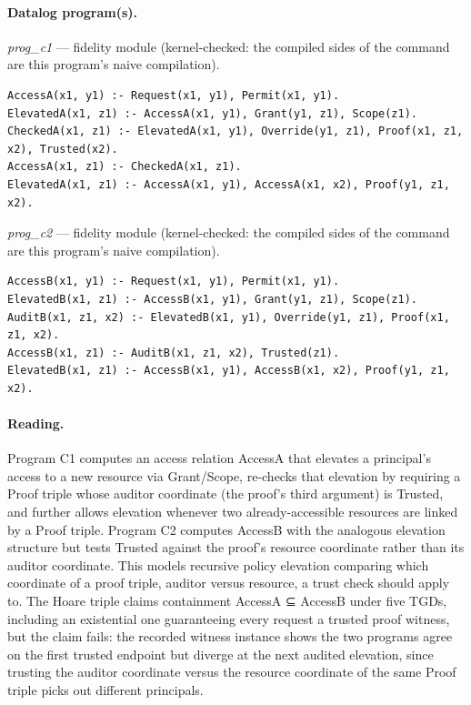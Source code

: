 \documentclass[10pt]{article}
\begin{document}
\paragraph{Datalog program(s).}

{\raggedright\textit{prog\_c1} --- fidelity module (kernel-checked: the compiled sides of the command are this program's naive compilation).\par}

\begin{Verbatim}[fontsize=\scriptsize,breaklines=true,breakanywhere=true,frame=single,framesep=1.5mm]
AccessA(x1, y1) :- Request(x1, y1), Permit(x1, y1).
ElevatedA(x1, z1) :- AccessA(x1, y1), Grant(y1, z1), Scope(z1).
CheckedA(x1, z1) :- ElevatedA(x1, y1), Override(y1, z1), Proof(x1, z1, x2), Trusted(x2).
AccessA(x1, z1) :- CheckedA(x1, z1).
ElevatedA(x1, z1) :- AccessA(x1, y1), AccessA(x1, x2), Proof(y1, z1, x2).
\end{Verbatim}

{\raggedright\textit{prog\_c2} --- fidelity module (kernel-checked: the compiled sides of the command are this program's naive compilation).\par}

\begin{Verbatim}[fontsize=\scriptsize,breaklines=true,breakanywhere=true,frame=single,framesep=1.5mm]
AccessB(x1, y1) :- Request(x1, y1), Permit(x1, y1).
ElevatedB(x1, z1) :- AccessB(x1, y1), Grant(y1, z1), Scope(z1).
AuditB(x1, z1, x2) :- ElevatedB(x1, y1), Override(y1, z1), Proof(x1, z1, x2).
AccessB(x1, z1) :- AuditB(x1, z1, x2), Trusted(z1).
ElevatedB(x1, z1) :- AccessB(x1, y1), AccessB(x1, x2), Proof(y1, z1, x2).
\end{Verbatim}

\paragraph{Reading.} Program C1 computes an access relation AccessA that elevates a principal's access to a new resource via Grant/Scope, re-checks that elevation by requiring a Proof triple whose auditor coordinate (the proof's third argument) is Trusted, and further allows elevation whenever two already-accessible resources are linked by a Proof triple. Program C2 computes AccessB with the analogous elevation structure but tests Trusted against the proof's resource coordinate rather than its auditor coordinate. This models recursive policy elevation comparing which coordinate of a proof triple, auditor versus resource, a trust check should apply to. The Hoare triple claims containment AccessA ⊆ AccessB under five TGDs, including an existential one guaranteeing every request a trusted proof witness, but the claim fails: the recorded witness instance shows the two programs agree on the first trusted endpoint but diverge at the next audited elevation, since trusting the auditor coordinate versus the resource coordinate of the same Proof triple picks out different principals.
\end{document}
